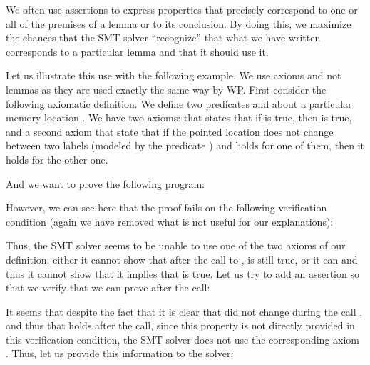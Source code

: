 

We often use assertions to express properties that precisely correspond to one
or all of the premises of a lemma or to its conclusion. By doing this, we
maximize the chances that the SMT solver ``recognize'' that what we have written
corresponds to a particular lemma and that it should use it. 



Let us illustrate this use with the following example. We use axioms and not
lemmas as they are used exactly the same way by WP. First consider the following
axiomatic definition. We define  two predicates  and
 about a particular memory location . We have two
axioms:  that states that if  is true, then
 is true, and a second axiom  that state that
if the pointed location does not change between two labels (modeled by the
predicate ) and  holds for one of them, then it
holds for the other one.





And we want to prove the following program:




However, we can see here that the proof fails on the following verification
condition (again we have removed what is not useful for our explanations):




Thus, the SMT solver seems to be unable to use one of the two axioms of our
definition: either it cannot show that after the call to ,
 is still true, or it can and thus it cannot show that it
implies that  is true. Let us try to add an assertion so that
we verify that we can prove  after the call:








It seems that despite the fact that it is clear that  did not
change during the call , and thus that
 holds after the call, since this property is
not directly provided in this verification condition, the SMT solver does not
use the corresponding axiom . Thus, let us provide this
information to the solver:


